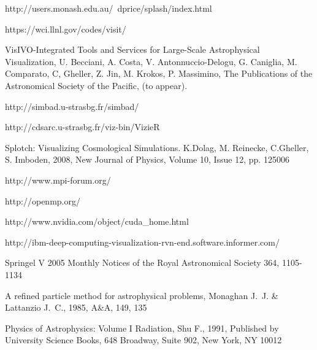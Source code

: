\begin{thebibliography}{00}
 http://users.monash.edu.au/~dprice/splash/index.html

 https://wci.llnl.gov/codes/visit/

VisIVO-Integrated Tools and Services for Large-Scale Astrophysical Visualization, U. Becciani, A. Costa, V. Antonnuccio-Delogu, G. Caniglia, M. Comparato, C, Gheller, Z. Jin, M. Krokos, P. Massimino, The Publications of the Astronomical Society of the Pacific, (to appear).

 http://simbad.u-strasbg.fr/simbad/

 http://cdsarc.u-strasbg.fr/viz-bin/VizieR

Splotch: Visualizing Cosmological Simulations. K.Dolag, 
M. Reinecke, C.Gheller, S. Imboden, 2008, New Journal of Physics, Volume 10, Issue 12, pp. 125006

 http://www.mpi-forum.org/

 http://openmp.org/

 http://www.nvidia.com/object/cuda\_home.html

 http://ibm-deep-computing-visualization-rvn-end.software.informer.com/

 Springel V 2005 Monthly Notices of the Royal Astronomical Society 364, 1105-1134

 A refined particle method for astrophysical problems, 
Monaghan J.~J. \& Lattanzio J.~C., 1985, A\&A, 149, 135

 Physics of Astrophysics: Volume I Radiation, Shu F., 1991,
Published by University Science Books, 648 Broadway, Suite 902, New York, NY 10012


\end{thebibliography}



